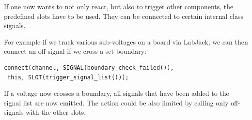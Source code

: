 \documentclass[10pt,a4paper]{article}
\begin{document}
If one now wants to not only react, but also to trigger other components, the predefined slots have to be used. They can be connected to certain internal class signals. 

For example if we track various sub-voltages on a board via LabJack, we can then connect an off-signal if we cross a set boundary:

\begin{lstlisting}
connect(channel, SIGNAL(boundary_check_failed()),
 this, SLOT(trigger_signal_list()));
\end{lstlisting}

If a voltage now crosses a boundary, all signals that have been added to the signal list are now emitted. The action could be also limited by calling only off-signals with the other slots.
\end{document}
